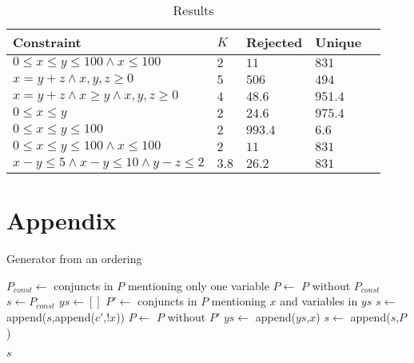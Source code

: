 \documentclass[sigconf,nonacm,review,anonymous]{acmart}
\begin{document}
\begin{center}
\begin{table}[]
\caption{Results}
\label{tab:data}
\centering
\begin{tabular}{|l|l|l|l|l|}
\hline
Constraint & $K$ & Rejected & Unique \\ \hline
     $0 \leq x \leq y \leq 100 \wedge x \leq 100$ & $2$ & $11$ & $831$ \\ \hline
     $x = y + z \wedge x,y,z \geq 0$      &   $5$   &    $506$      &     $494$   \\ \hline
     $x = y + z \wedge x \geq y \wedge x,y,z \geq 0$      &   $4$  &    $48.6$      &    $951.4$    \\ \hline
     $0 \leq x \leq y $  &  $2$   &  $24.6$   &       $975.4$       \\ \hline
     $0 \leq x \leq y \leq 100$ & $2$ & $993.4$ & $6.6$ \\ \hline
     $0 \leq x \leq y \leq 100 \wedge x \leq 100$ & $2$ & $11$ & $831$ \\ \hline
     $x - y \leq 5 \wedge x - y \leq 10 \wedge y - z \leq 2$ & $3.8$ & $26.2$ & $831$ \\ \hline
\end{tabular}
\end{table}
\end{center}




\newpage
\appendix
\section*{Appendix}

\begin{algorithm}
    \caption{Generator from an ordering}
    \label{alg:fixed-ordering}
    \begin{algorithmic}
       \State $P_{const} \gets$ conjuncts in $P$ mentioning only one variable
       \State $P \gets$ $P$ without $P_{const}$
       \State $s \gets P_{const}$ 
       \State $ys \gets []$ 
         \State $P' \gets$ conjuncts in $P$ mentioning $x$ and variables in $ys$
         \State $s \gets$ append($s$,append($c'$,$!x$))
         \State $P \gets$ $P$ without $P'$
         \State $ys \gets$ append($ys$,$x$)
       \EndFor
       \State $s \gets$ append($s$,$P$)
       
       \Return $s$
      \EndFunction
    \end{algorithmic}
\end{algorithm}
\end{document}

